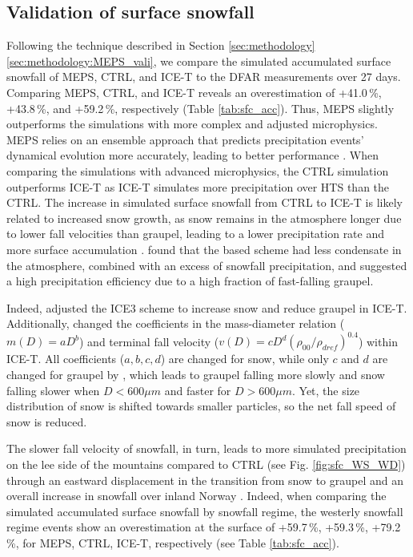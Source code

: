 \documentclass{ametsocV5}
\begin{document}
	\subsection{Validation of surface snowfall}\label{sec:res:season_sfc}
		Following the technique described in Section \ref{sec:methodology}\ref{sec:methodology:MEPS_vali}, we compare the simulated accumulated surface snowfall of MEPS, CTRL, and ICE-T to the DFAR measurements over 27 days. Comparing MEPS, CTRL, and ICE-T reveals an overestimation of +41.0\,\%, +43.8\,\%, and +59.2\,\%, respectively (Table \ref{tab:sfc_acc}). Thus, MEPS slightly outperforms the simulations with more complex and adjusted microphysics. MEPS relies on an ensemble approach that predicts precipitation events' dynamical evolution more accurately, leading to better performance \citep{frogner_convection-permitting_2019}. When comparing the simulations with advanced microphysics, the CTRL simulation outperforms ICE-T as ICE-T simulates more precipitation over HTS than the CTRL. 
		The increase in simulated surface snowfall from CTRL to ICE-T is likely related to increased snow growth, as snow remains in the atmosphere longer due to lower fall velocities than graupel, leading to a lower precipitation rate and more surface accumulation \citep{engdahl_effects_2020}. \citet{liu_high-resolution_2011} found that the \citet{lin_bulk_1983} based scheme had less condensate in the atmosphere, combined with an excess of snowfall precipitation, and suggested a high precipitation efficiency due to a high fraction of fast-falling graupel.

		
		Indeed, \citet{engdahl_improving_2020} adjusted the ICE3 scheme to increase snow and reduce graupel in ICE-T. Additionally, \citet{engdahl_improving_2020} changed the coefficients in the mass-diameter relation ($m(D) = aD^b$) and terminal fall velocity ($v(D) = cD^d (\rho_{00}/\rho_{dref})^{0.4}$) within ICE-T. All coefficients ($a, b, c, d$) are changed for snow, while only $c$ and $d$ are changed for graupel by \citet{engdahl_improving_2020}, which leads to graupel falling more slowly and snow falling slower when $D < 600\mu m$ and faster for $D > 600\mu m$. Yet, the size distribution of snow is shifted towards smaller particles, so the net fall speed of snow is reduced. 
		
		The slower fall velocity of snowfall, in turn, leads to more simulated precipitation on the lee side of the mountains compared to CTRL (see Fig. \ref{fig:sfc_WS_WD}) through an eastward displacement in the transition from snow to graupel and an overall increase in snowfall over inland Norway \citep{engdahl_effects_2020}. Indeed, when comparing the simulated accumulated surface snowfall by snowfall regime, the westerly snowfall regime events show an overestimation at the surface of +59.7\,\%, +59.3\,\%, +79.2\,\%, for MEPS, CTRL, ICE-T, respectively (see Table \ref{tab:sfc_acc}). 
		
\end{document}

